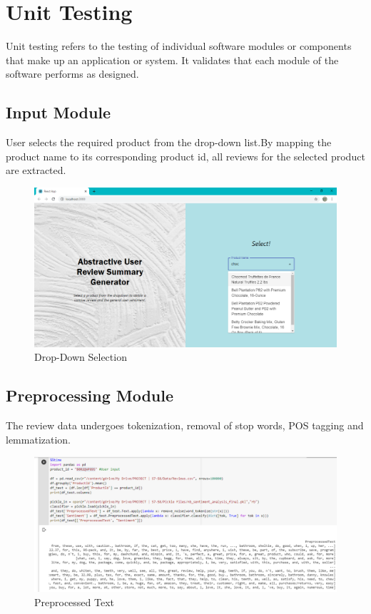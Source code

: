 \documentclass[11pt]{report}
\begin{document}
\section{Unit Testing}
Unit testing refers to the testing of individual software modules or components that make up an application or system. It validates that each module of the software performs as designed.

\subsection{Input Module}
User selects the required product from the drop-down list.By mapping the product name to its corresponding product id, all reviews for the selected product are extracted.
\begin{figure}[H]
\centering
\includegraphics[scale=0.5]{images/dropdown.png}
\caption{Drop-Down Selection}
\label{fig:dropdown}
\end{figure}

\subsection{Preprocessing Module}
The review data undergoes tokenization, removal of stop words, POS tagging and lemmatization. 
\begin{figure}[H]
\centering
\includegraphics[scale=0.5]{images/Preprocessed Text.png}
\caption{Preprocessed Text}
\label{fig:preprocess}
\end{figure}
\end{document}
